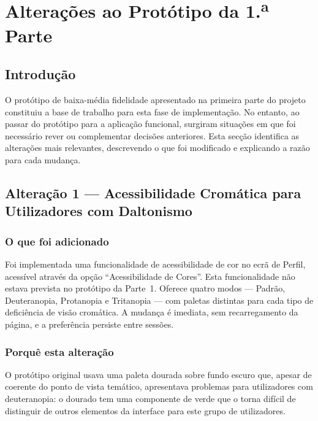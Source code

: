 \chapter{Alterações ao Protótipo da 1.\textsuperscript{a} Parte}
\label{chap:alteracoes}

\section{Introdução}
\label{chap6:sec:intro}

O protótipo de baixa-média fidelidade apresentado na primeira parte do projeto constituiu a base de trabalho para esta fase de implementação. No entanto, ao passar do protótipo para a aplicação funcional, surgiram situações em que foi necessário rever ou complementar decisões anteriores. Esta secção identifica as alterações mais relevantes, descrevendo o que foi modificado e explicando a razão para cada mudança.

\section{Alteração 1 --- Acessibilidade Cromática para Utilizadores com Daltonismo}
\label{chap6:sec:alt1}

\subsection{O que foi adicionado}

Foi implementada uma funcionalidade de acessibilidade de cor no ecrã de Perfil, acessível através da opção ``Acessibilidade de Cores''. Esta funcionalidade não estava prevista no protótipo da Parte~1. Oferece quatro modos --- Padrão, Deuteranopia, Protanopia e Tritanopia --- com paletas distintas para cada tipo de deficiência de visão cromática. A mudança é imediata, sem recarregamento da página, e a preferência persiste entre sessões.

\subsection{Porquê esta alteração}

O protótipo original usava uma paleta dourada sobre fundo escuro que, apesar de coerente do ponto de vista temático, apresentava problemas para utilizadores com deuteranopia: o dourado tem uma componente de verde que o torna difícil de distinguir de outros elementos da interface para este grupo de utilizadores.

